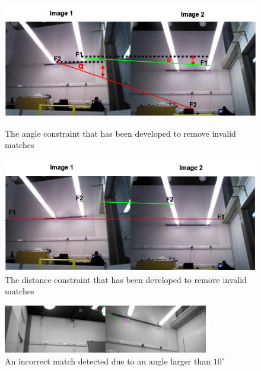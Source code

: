 \documentclass[11pt]{report}
\begin{document}
\begin{figure}[ht!]
\begin{minipage}[b]{0.5\linewidth}
  \centering
    \includegraphics[width=1.0\textwidth]{../Drawings/constraints/angleConstraintMerged.jpg}
    \caption{The angle constraint that has been developed to remove invalid matches} 
    \label{fig:angleConstraint}
\end{minipage}
\begin{minipage}[b]{0.5\linewidth}
  \centering
    \includegraphics[width=1.0\textwidth]{../Drawings/constraints/distanceConstraint.jpg}
    \caption{The distance constraint that has been developed to remove invalid matches} 
    \label{fig:distanceConstraint}
\end{minipage}
\end{figure}

\begin{figure}[h!] 
  \centering
    \includegraphics[width=0.8\textwidth]{../Drawings/constraints/t_20_hd_55_OG_Left_MG_Right_2_12.jpg}
    \caption{An incorrect match detected due to an angle larger than $10^\circ$}
    \label{fig:imagesSide}
\end{figure}
\end{document}
